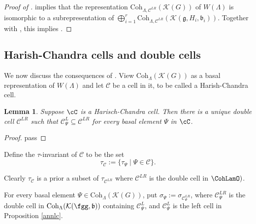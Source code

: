 \documentclass[12pt]{amsart}
\def\subset{\subseteq}
\newcommand{\CC}{{\mathcal {C}}}
\newcommand{\CK}{{\mathcal {K}}}
\DeclareMathOperator{\Ann}{Ann}
\def\CCL{\CC^L}
\def\CCLR{\CC^{LR}}
\newcommand{\g}{\mathfrak g}
\renewcommand{\b}{\mathfrak b}
\newcommand{\n}{\mathfrak n}
\newcommand{\Z}{\mathbb{Z}}
\numberwithin{equation}{section}
\newtheorem{lem}[thm]{Lemma}
\theoremstyle{remark}
\def\Coh{\mathrm{Coh}}
\begin{document}
\begin{proof}[Proof of ]
 implies that the representation $\Coh_{\Lambda,\CCLR}(\CK(G))$
of $W(\Lambda)$ is isomorphic to a subrepresentation of
$\bigoplus_{i=1}^r \Coh_{\Lambda,\CCLR}(\CK(\g,H_i,\b_i))$.
Together with  , this implies .
\end{proof}


%

\subsection{Harish-Chandra cells and double cells}\label{subsec:tau-HC}

We now discuss the consequences of .
View $\Coh_{\Lambda}(\CK(G))$ as a basal representation of $W(\Lambda)$ and let $\CC$ be a cell in it, to be called a Harish-Chandra cell.


\begin{lem}
Suppose $\cC$ is a Harisch-Chandra cell. Then
there is a unique double cell $\CCLR$
such that $\CCL_{\Psi}\subset \CCLR$ for every basal element $\Psi$ in $\cC$.
\end{lem}
\begin{proof}
 pass
\end{proof}

Define the $\tau$-invariant of $\CC$ to be the set
\[
  \tau_\CC:=\{\tau_\Psi\mid \Psi\in \CC\}.
\]


Clearly $\tau_{\CC}$ is a prior a subset of $\tau_{\CCLR}$ where $\CCLR$ is the
double cell in $\CohLamO)$.


For every  basal element $\Psi\in \Coh_\Lambda(\CK(G))$,
 put
$\sigma_{\Psi}:= \sigma_{\CCLR_\Psi}$,
where $\CCLR_\Psi$ is the  double cell in $\Coh_\Lambda(\CK(\fgg,\b))$
containing $\CCL_\Psi$, and  $\CCL_\Psi$ is the left cell in Proposition \ref{annlc}.
\end{document}

